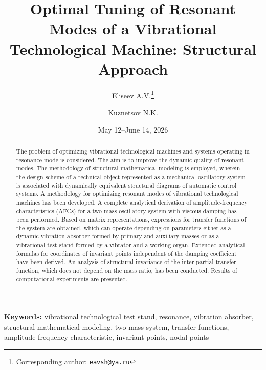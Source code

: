 \documentclass[12pt, a4paper]{article}
\title{\textbf{Optimal Tuning of Resonant Modes of a Vibrational Technological Machine: Structural Approach}}
\author[1,2]{Eliseev A.V.\thanks{Corresponding author: \texttt{eavsh@ya.ru}}}
\author[2]{Kuznetsov N.K.}
\affil[1]{Irkutsk State University of Railway Transport (IrGUPS), Irkutsk, Russian Federation}
\affil[2]{Irkutsk National Research Technical University (IRNITU), Irkutsk, Russian Federation}
\date{May 12--June 14, 2026}
\begin{document}
	
	\maketitle
	
	\begin{center}
	\end{center}
	\vspace{1em}
	
	\begin{abstract}
		
		The problem of optimizing vibrational technological machines and systems operating in resonance mode is considered. The aim is to improve the dynamic quality of resonant modes. The methodology of structural mathematical modeling is employed, wherein the design scheme of a technical object represented as a mechanical oscillatory system is associated with dynamically equivalent structural diagrams of automatic control systems. A methodology for optimizing resonant modes of vibrational technological machines has been developed. A complete analytical derivation of amplitude-frequency characteristics (AFCs) for a two-mass oscillatory system with viscous damping has been performed. Based on matrix representations, expressions for transfer functions of the system are obtained, which can operate depending on parameters either as a dynamic vibration absorber formed by primary and auxiliary masses or as a vibrational test stand formed by a vibrator and a working organ. Extended analytical formulas for coordinates of invariant points independent of the damping coefficient have been derived. An analysis of structural invariance of the inter-partial transfer function, which does not depend on the mass ratio, has been conducted. Results of computational experiments are presented.
	\end{abstract}
	
	\noindent\textbf{Keywords:} vibrational technological test stand, resonance, vibration absorber, structural mathematical modeling, two-mass system, transfer functions, amplitude-frequency characteristic, invariant points, nodal points
	
\end{document}
